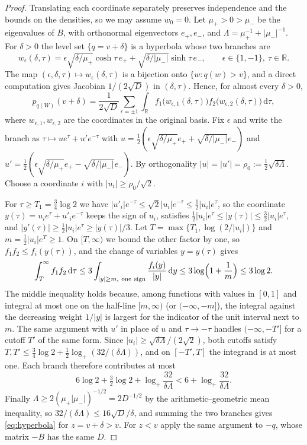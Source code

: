 \documentclass[11pt]{amsart}
\numberwithin{equation}{section}
\theoremstyle{definition}
\theoremstyle{remark}
\newcommand{\R}{\mathbb R}
\newcommand{\1}{\mathbf 1}
\newcommand{\dd}{\,\mathrm d}
\newcommand{\logp}{\log_+}
\newcommand{\abs}[1]{\lvert #1\rvert}
\begin{document}
\begin{proof}
Translating each coordinate separately preserves independence and the bounds on the densities, so we may assume $w_0=0$. Let $\mu_+>0>\mu_-$ be the eigenvalues of $B$, with orthonormal eigenvectors $e_+,e_-$, and $\Lambda=\mu_+^{-1}+\abs{\mu_-}^{-1}$. For $\delta>0$ the level set $\{q=v+\delta\}$ is a hyperbola whose two branches are
\[
w_\epsilon(\delta,\tau)=\epsilon\sqrt{\delta/\mu_+}\cosh\tau\,e_++\sqrt{\delta/\abs{\mu_-}}\sinh\tau\,e_-,\qquad\epsilon\in\{1,-1\},\ \tau\in\R .
\]
The map $(\epsilon,\delta,\tau)\mapsto w_\epsilon(\delta,\tau)$ is a bijection onto $\{w:q(w)>v\}$, and a direct computation gives Jacobian $1/(2\sqrt D)$ in $(\delta,\tau)$. Hence, for almost every $\delta>0$,
\[
p_{q(W)}(v+\delta)=\frac1{2\sqrt D}\sum_{\epsilon=\pm1}\int_\R f_1\bigl(w_{\epsilon,1}(\delta,\tau)\bigr)f_2\bigl(w_{\epsilon,2}(\delta,\tau)\bigr)\dd\tau,
\]
where $w_{\epsilon,1},w_{\epsilon,2}$ are the coordinates in the original basis. Fix $\epsilon$ and write the branch as $\tau\mapsto ue^\tau+u'e^{-\tau}$ with $u=\frac12(\epsilon\sqrt{\delta/\mu_+}e_++\sqrt{\delta/\abs{\mu_-}}e_-)$ and $u'=\frac12(\epsilon\sqrt{\delta/\mu_+}e_+-\sqrt{\delta/\abs{\mu_-}}e_-)$. By orthogonality $\abs u=\abs{u'}=\rho_0:=\frac12\sqrt{\delta\Lambda}$. Choose a coordinate $i$ with $\abs{u_i}\ge\rho_0/\sqrt2$.

For $\tau\ge T_1=\frac34\log2$ we have $\abs{u'_i}e^{-\tau}\le\sqrt2\abs{u_i}e^{-\tau}\le\frac12\abs{u_i}e^\tau$, so the coordinate $y(\tau)=u_ie^\tau+u'_ie^{-\tau}$ keeps the sign of $u_i$, satisfies $\frac12\abs{u_i}e^\tau\le\abs{y(\tau)}\le\frac32\abs{u_i}e^\tau$, and $\abs{y'(\tau)}\ge\frac12\abs{u_i}e^\tau\ge\abs{y(\tau)}/3$. Let $T=\max\{T_1,\log(2/\abs{u_i})\}$ and $m=\frac12\abs{u_i}e^T\ge1$. On $[T,\infty)$ we bound the other factor by one, so $f_1f_2\le f_i(y(\tau))$, and the change of variables $y=y(\tau)$ gives
\[
\int_T^\infty f_1f_2\dd\tau\le3\int_{\abs y\ge m,\ \mathrm{one\ sign}}\frac{f_i(y)}{\abs y}\dd y\le3\log\Bigl(1+\frac1m\Bigr)\le3\log2 .
\]
The middle inequality holds because, among functions with values in $[0,1]$ and integral at most one on the half-line $[m,\infty)$ (or $(-\infty,-m]$), the integral against the decreasing weight $1/\abs y$ is largest for the indicator of the unit interval next to $m$. The same argument with $u'$ in place of $u$ and $\tau\to-\tau$ handles $(-\infty,-T']$ for a cutoff $T'$ of the same form. Since $\abs{u_i}\ge\sqrt{\delta\Lambda}/(2\sqrt2)$, both cutoffs satisfy $T,T'\le\frac34\log2+\frac12\logp(32/(\delta\Lambda))$, and on $[-T',T]$ the integrand is at most one. Each branch therefore contributes at most
\[
6\log2+\tfrac32\log2+\logp\frac{32}{\delta\Lambda}<6+\logp\frac{32}{\delta\Lambda}.
\]
Finally $\Lambda\ge2(\mu_+\abs{\mu_-})^{-1/2}=2D^{-1/2}$ by the arithmetic--geometric mean inequality, so $32/(\delta\Lambda)\le16\sqrt D/\delta$, and summing the two branches gives \eqref{eq:hyperbola} for $z=v+\delta>v$. For $z<v$ apply the same argument to $-q$, whose matrix $-B$ has the same $D$.
\end{proof}
\end{document}
